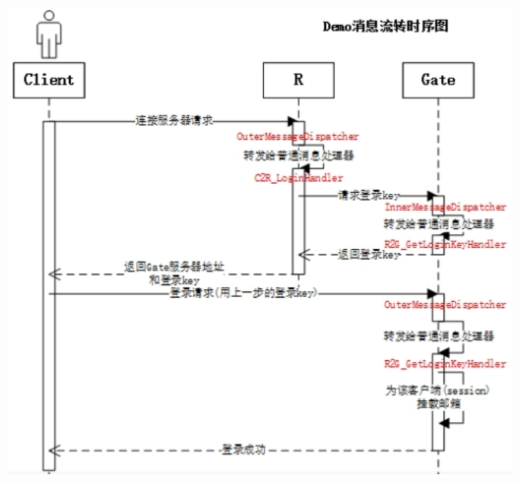 \documentclass[9pt, b5paper]{article}
\begin{document}
\includegraphics[width=.9\linewidth]{./pic/readme_20230219_104114.png}
\end{document}
